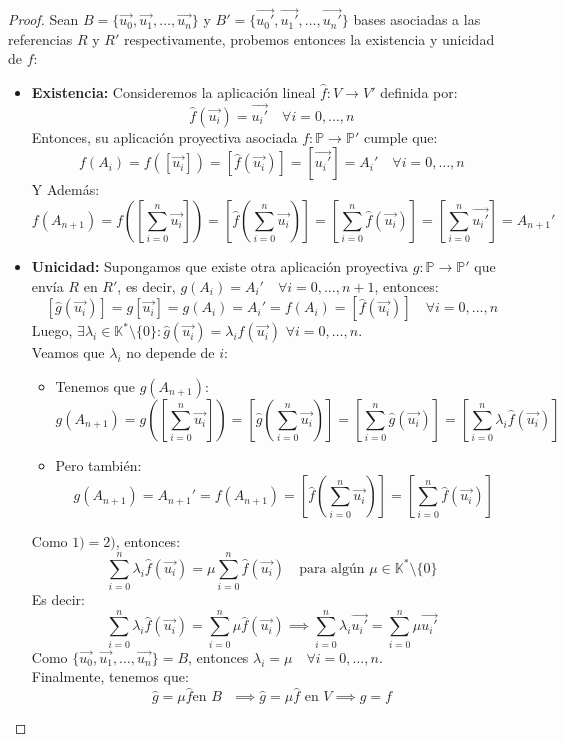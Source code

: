 \begin{proof}
    Sean $B = \{\vec{u_0}, \vec{u_1}, \ldots, \vec{u_n}\}$ y $B' = \{\vec{u_0'}, \vec{u_1'}, \ldots, \vec{u_n'}\}$ bases asociadas a las referencias $R$ y $R'$ respectivamente, probemos entonces la existencia y unicidad de $f$:
    \begin{itemize}
        \item \textbf{Existencia:} Consideremos la aplicación lineal $\hat{f}:V \to V'$ definida por:
        \[
            \hat{f}(\vec{u_i}) = \vec{u_i'} \quad \forall i = 0, \ldots, n
        \]
        Entonces, su aplicación proyectiva asociada $f:\mathbb{P} \to \mathbb{P}'$ cumple que:
        \[
            f(A_i) = f([\vec{u_i}]) = [\hat{f}(\vec{u_i})] = [\vec{u_i'}] = A_i' \quad \forall i = 0, \ldots, n
        \]
        Y Además:
        \[
            f(A_{n+1}) = f([\sum_{i=0}^n \vec{u_i}]) = [\hat{f}(\sum_{i=0}^n \vec{u_i})] = [\sum_{i=0}^n \hat{f}(\vec{u_i})] = [\sum_{i=0}^n \vec{u_i'}] = A_{n+1}'
        \]
        \item \textbf{Unicidad:} Supongamos que existe otra aplicación proyectiva $g:\mathbb{P} \to \mathbb{P}'$ que envía $R$ en $R'$, es decir, $g(A_i) = A_i' \quad \forall i = 0, \ldots, n+1$, entonces:
        \[
            [\hat{g}(\vec{u_i})] = g[\vec{u_i}] = g(A_i) = A_i' = f(A_i) = [\hat{f}(\vec{u_i})] \quad \forall i = 0, \ldots, n
        \]
        Luego, $\exists \lambda_i \in \mathbb{K}^* \setminus \{0\} : \hat{g}(\vec{u_i}) = \lambda_i \hat{f}(\vec{u_i})$ $\forall i = 0, \ldots, n$.\\
        Veamos que $\lambda_i$ no depende de $i$:
        \begin{itemize}
            \item[1)] Tenemos que $g(A_{n+1})$:
            \[
            g(A_{n+1}) = g([\sum_{i=0}^n \vec{u_i}]) = [\hat{g}(\sum_{i=0}^n \vec{u_i})] = [\sum_{i=0}^n \hat{g}(\vec{u_i})] = [\sum_{i=0}^n \lambda_i \hat{f}(\vec{u_i})]
            \]
            \item[2)] Pero también:
            \[
            g(A_{n+1}) = A_{n+1}' = f(A_{n+1}) = [\hat{f}(\sum_{i=0}^n \vec{u_i})] = [\sum_{i=0}^n \hat{f}(\vec{u_i})]
            \]
        \end{itemize}
        Como $1) = 2)$, entonces:
        \[
            \sum_{i=0}^n \lambda_i \hat{f}(\vec{u_i}) = \mu \sum_{i=0}^n \hat{f}(\vec{u_i}) \quad \text{para algún } \mu \in \mathbb{K}^* \setminus \{0\}
        \]
        Es decir:
        \[
            \sum_{i=0}^n \lambda_i \hat{f}(\vec{u_i}) = \sum_{i=0}^n \mu \hat{f}(\vec{u_i}) \implies \sum_{i=0}^n \lambda_i \vec{u_i'} = \sum_{i=0}^n \mu \vec{u_i'}
        \]
        Como $\{\vec{u_0}, \vec{u_1}, \ldots, \vec{u_n}\} = B$, entonces $\lambda_i = \mu \quad \forall i = 0, \ldots, n$.\\
        Finalmente, tenemos que:
        \[
            \hat{g} = \mu \hat{f} \text {en $B$ } \implies \hat{g} = \mu \hat{f} \text{ en } V \implies g = f
        \]
    \end{itemize}
\end{proof}

